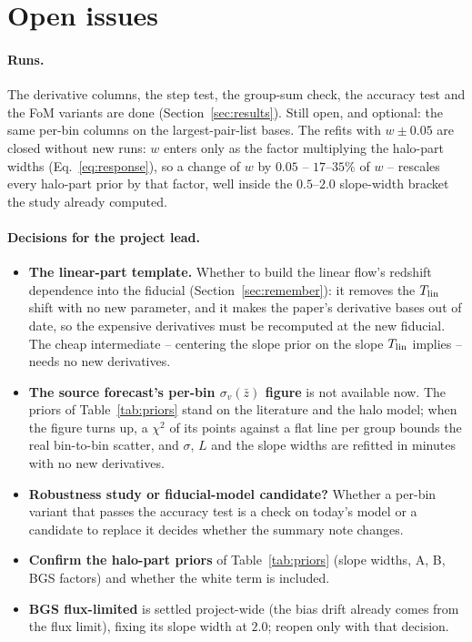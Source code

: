 \documentclass[11pt]{article}
\newcommand{\sv}{\sigma_v}
\begin{document}
\appendix

\section{Open issues}
\label{app:open}

\paragraph{Runs.}
The derivative columns, the step test, the group-sum check, the
accuracy test and the FoM variants are done
(Section~\ref{sec:results}).  Still open, and optional: the same
per-bin columns on the largest-pair-list bases.  The refits with
$w \pm 0.05$ are closed without new runs: $w$ enters only as the
factor multiplying the halo-part widths (Eq.~\eqref{eq:response}),
so a change of $w$ by $0.05$ -- $17$--$35\%$ of $w$ -- rescales
every halo-part prior by that factor, well inside the
$0.5$--$2.0$ slope-width bracket the study already computed.

\paragraph{Decisions for the project lead.}
\begin{itemize}
  \item \textbf{The linear-part template.}  Whether to build the
    linear flow's redshift dependence into the fiducial
    (Section~\ref{sec:remember}): it removes the $T_{\rm lin}$
    shift with no new parameter, and it makes the paper's
    derivative bases out of date, so the expensive derivatives must
    be recomputed at the new fiducial.  The cheap intermediate --
    centering the slope prior on the slope $T_{\rm lin}$ implies --
    needs no new derivatives.
  \item \textbf{The source forecast's per-bin $\sv(\bar{z})$ figure}
    is not available now.  The priors of Table~\ref{tab:priors}
    stand on the literature and the halo model; when the figure turns
    up, a $\chi^2$ of its points against a flat line per group bounds
    the real bin-to-bin scatter, and $\sigma$, $L$ and the slope
    widths are refitted in minutes with no new derivatives.
  \item \textbf{Robustness study or fiducial-model candidate?}
    Whether a per-bin variant that passes the accuracy test is a
    check on today's model or a candidate to replace it decides
    whether the summary note changes.
  \item \textbf{Confirm the halo-part priors} of
    Table~\ref{tab:priors} (slope widths, A, B, BGS factors) and
    whether the white term is included.
  \item \textbf{BGS flux-limited} is settled project-wide (the bias
    drift already comes from the flux limit), fixing its slope width
    at $2.0$; reopen only with that decision.
\end{itemize}
\end{document}

